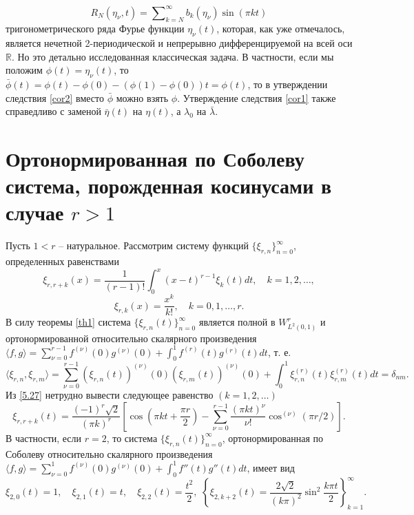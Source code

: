 \begin{equation}\label{5.26}
R_N(\eta_\nu,t)= \sum\nolimits_{k=N}^\infty b_k(\eta_\nu)\sin(\pi kt)
\end{equation}
тригонометрического ряда Фурье  функции $\eta_\nu(t)$, которая, как уже отмечалось, является нечетной 2-периодической и непрерывно дифференцируемой на всей оси $\mathbb{R}$. Но это детально исследованная классическая задача. В частности, если мы положим $\phi(t)=\eta_\nu(t)$, то $\bar \phi(t)=\phi(t)-\phi(0)-(\phi(1)-\phi(0))t=\phi(t)$, то в утверждении следствия  \ref{cor2} вместо  $\bar \phi$ можно взять $\phi$. Утверждение следствия \ref{cor1} также справедливо с заменой  $\bar\eta(t)$  на $\eta(t)$, а   $\lambda_0$ на $\bar\lambda$.

\section{Ортонормированная по Соболеву  система, порожденная косинусами в случае $r>1$}

Пусть $1<r$ -- натуральное. Рассмотрим систему функций $\{\xi_{r,n}\}_{n=0}^\infty$, определенных равенствами
\begin{equation}\label{5.27}
\xi_{r,r+k}(x) =\frac{1}{(r-1)!}\int_0^x(x-t)^{r-1}\xi_{k}(t)dt, \quad k=1,2,\ldots,
\end{equation}
\begin{equation}\label{5.28}
\xi_{r,k}(x) =\frac{x^k}{k!}, \quad k=0,1,\ldots, r.
\end{equation}
В силу теоремы \ref{th1} система $\{\xi_{r,n}(t)\}_{n=0}^\infty$ является полной в $W^r_{L^2(0,1)}$ и ортонормированной относительно скалярного произведения $\langle f,g\rangle=\sum_{\nu=0}^{r-1}f^{(\nu)}(0)g^{(\nu)}(0)+\int_0^1 f^{(r)}(t)g^{(r)}(t)dt$, т. е.
\begin{equation*}
\langle\xi_{r,n},\xi_{r,m}\rangle=
\sum_{\nu=0}^{r-1}(\xi_{r,n}(t))^{(\nu)}(0)(\xi_{r,m}(t))^{(\nu)}(0)
+\int_0^1\xi^{(r)}_{r,n}(t)\xi^{(r)}_{r,m}(t)dt=\delta_{nm}.
\end{equation*}
Из \eqref{5.27} нетрудно вывести следующее равенство $(k=1,2,\ldots)$
\begin{equation}\label{5.29}
\xi_{r,r+k}(t) =\frac{(-1)^r\sqrt{2}}{(\pi k)^r}\left[
\cos\left(\pi kt+\frac{\pi r}{2}\right)-\sum_{\nu=0}^{r-1} \frac{(\pi kt)^\nu}{\nu!}\cos^{(\nu)}(\pi r/2)\right].
\end{equation}
В частности, если $r=2$, то система $\{\xi_{r,n}(t)\}_{n=0}^\infty$, ортонормированная по Соболеву относительно скалярного произведения $\langle f,g\rangle=\sum_{\nu=0}^1f^{(\nu)}(0)g^{(\nu)}(0)+\int_0^1 f''(t)g''(t)dt$,
имеет вид
\begin{equation}\label{5.30}
\xi_{2,0}(t) =1, \quad \xi_{2,1}(t)=t, \quad \xi_{2,2}(t)=\frac{t^2}2,\,\,\left\{ \xi_{2,k+2}(t)=  \frac{2\sqrt{2}}{(k\pi)^2}\sin^2\frac{k\pi t}{2}\right\}_{k=1}^\infty.
\end{equation}



